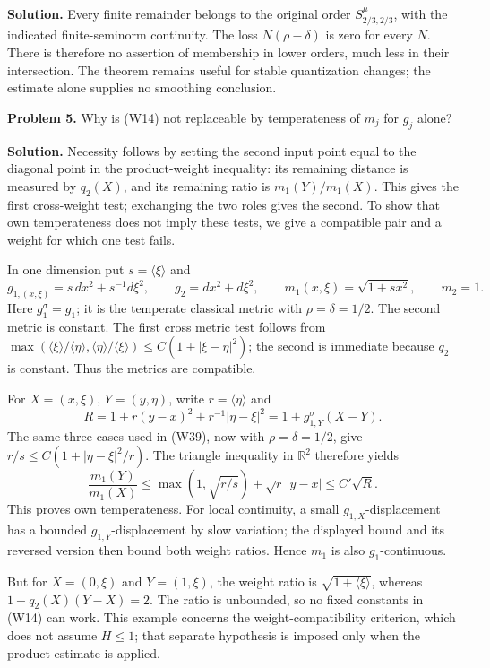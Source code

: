 \documentclass[
  11pt,
]{article}
\begin{document}
\textbf{Solution.} Every finite remainder belongs to the original order
\(S^\mu_{2/3,2/3}\), with the indicated finite-seminorm continuity. The
loss \(N(\rho-\delta)\) is zero for every \(N\). There is therefore no
assertion of membership in lower orders, much less in their
intersection. The theorem remains useful for stable quantization
changes; the estimate alone supplies no smoothing conclusion.

\textbf{Problem 5.} Why is (W14) not replaceable by temperateness of
\(m_j\) for \(g_j\) alone?

\textbf{Solution.} Necessity follows by setting the second input point
equal to the diagonal point in the product-weight inequality: its
remaining distance is measured by \(q_2(X)\), and its remaining ratio is
\(m_1(Y)/m_1(X)\). This gives the first cross-weight test; exchanging
the two roles gives the second. To show that own temperateness does not
imply these tests, we give a compatible pair and a weight for which one
test fails.

In one dimension put \(s=\langle\xi\rangle\) and \[
g_{1,(x,\xi)}=s\,dx^2+s^{-1}d\xi^2,\qquad
g_2=dx^2+d\xi^2,\qquad
m_1(x,\xi)=\sqrt{1+s x^2},\qquad m_2=1.
\] Here \(g_1^\sigma=g_1\); it is the temperate classical metric with
\(\rho=\delta=1/2\). The second metric is constant. The first cross
metric test follows from
\(\max(\langle\xi\rangle/\langle\eta\rangle,\langle\eta\rangle/\langle\xi\rangle)\leq C(1+|\xi-\eta|^2)\);
the second is immediate because \(q_2\) is constant. Thus the metrics
are compatible.

For \(X=(x,\xi)\), \(Y=(y,\eta)\), write \(r=\langle\eta\rangle\) and \[
R=1+r(y-x)^2+r^{-1}|\eta-\xi|^2=1+g_{1,Y}^\sigma(X-Y).
\] The same three cases used in (W39), now with \(\rho=\delta=1/2\),
give \(r/s\leq C(1+|\eta-\xi|^2/r)\). The triangle inequality in
\(\mathbb R^2\) therefore yields \[
\frac{m_1(Y)}{m_1(X)}
\leq\max(1,\sqrt{r/s})+\sqrt r\,|y-x|
\leq C'\sqrt R.
\] This proves own temperateness. For local continuity, a small
\(g_{1,X}\)-displacement has a bounded \(g_{1,Y}\)-displacement by slow
variation; the displayed bound and its reversed version then bound both
weight ratios. Hence \(m_1\) is also \(g_1\)-continuous.

But for \(X=(0,\xi)\) and \(Y=(1,\xi)\), the weight ratio is
\(\sqrt{1+\langle\xi\rangle}\), whereas \(1+q_2(X)(Y-X)=2\). The ratio
is unbounded, so no fixed constants in (W14) can work. This example
concerns the weight-compatibility criterion, which does not assume
\(H\leq1\); that separate hypothesis is imposed only when the product
estimate is applied.
\end{document}
